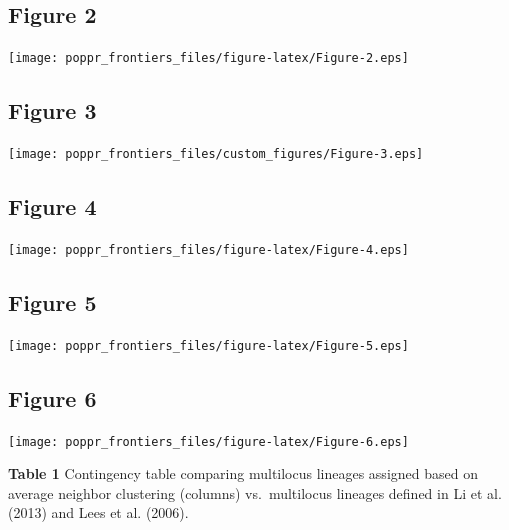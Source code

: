 \documentclass{frontiersSCNS} %
\newenvironment{CodeChunk}{}{}
\begin{document}
\subsection*{Figure 2}\label{figure-2}

\begin{CodeChunk}

\texttt{[image: poppr\_frontiers\_files/figure-latex/Figure-2.eps]} \end{CodeChunk}

\subsection*{Figure 3}\label{figure-3}

\texttt{[image: poppr\_frontiers\_files/custom\_figures/Figure-3.eps]}

\subsection*{Figure 4}\label{figure-4}

\begin{CodeChunk}

\texttt{[image: poppr\_frontiers\_files/figure-latex/Figure-4.eps]} \end{CodeChunk}

\subsection*{Figure 5}\label{figure-5}

\begin{CodeChunk}

\texttt{[image: poppr\_frontiers\_files/figure-latex/Figure-5.eps]} \end{CodeChunk}

\subsection*{Figure 6}\label{figure-6}

\begin{CodeChunk}

\texttt{[image: poppr\_frontiers\_files/figure-latex/Figure-6.eps]} \end{CodeChunk}

\textbf{Table 1} Contingency table comparing multilocus lineages
assigned based on average neighbor clustering (columns) vs.~multilocus
lineages defined in Li et al. (2013) and Lees et al. (2006).
\end{document}
